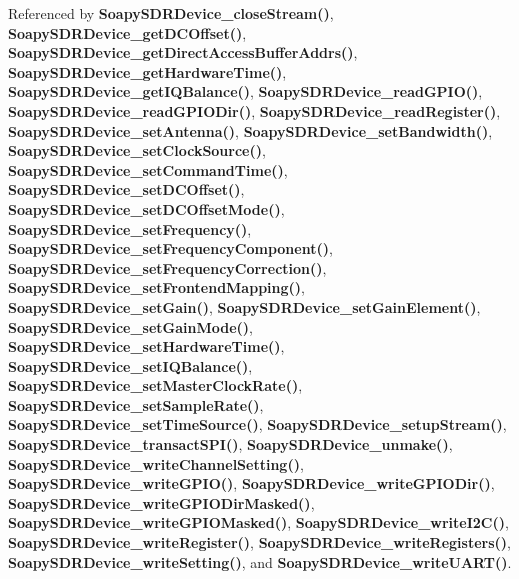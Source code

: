 Referenced by {\bf Soapy\+S\+D\+R\+Device\+\_\+close\+Stream()}, {\bf Soapy\+S\+D\+R\+Device\+\_\+get\+D\+C\+Offset()}, {\bf Soapy\+S\+D\+R\+Device\+\_\+get\+Direct\+Access\+Buffer\+Addrs()}, {\bf Soapy\+S\+D\+R\+Device\+\_\+get\+Hardware\+Time()}, {\bf Soapy\+S\+D\+R\+Device\+\_\+get\+I\+Q\+Balance()}, {\bf Soapy\+S\+D\+R\+Device\+\_\+read\+G\+P\+I\+O()}, {\bf Soapy\+S\+D\+R\+Device\+\_\+read\+G\+P\+I\+O\+Dir()}, {\bf Soapy\+S\+D\+R\+Device\+\_\+read\+Register()}, {\bf Soapy\+S\+D\+R\+Device\+\_\+set\+Antenna()}, {\bf Soapy\+S\+D\+R\+Device\+\_\+set\+Bandwidth()}, {\bf Soapy\+S\+D\+R\+Device\+\_\+set\+Clock\+Source()}, {\bf Soapy\+S\+D\+R\+Device\+\_\+set\+Command\+Time()}, {\bf Soapy\+S\+D\+R\+Device\+\_\+set\+D\+C\+Offset()}, {\bf Soapy\+S\+D\+R\+Device\+\_\+set\+D\+C\+Offset\+Mode()}, {\bf Soapy\+S\+D\+R\+Device\+\_\+set\+Frequency()}, {\bf Soapy\+S\+D\+R\+Device\+\_\+set\+Frequency\+Component()}, {\bf Soapy\+S\+D\+R\+Device\+\_\+set\+Frequency\+Correction()}, {\bf Soapy\+S\+D\+R\+Device\+\_\+set\+Frontend\+Mapping()}, {\bf Soapy\+S\+D\+R\+Device\+\_\+set\+Gain()}, {\bf Soapy\+S\+D\+R\+Device\+\_\+set\+Gain\+Element()}, {\bf Soapy\+S\+D\+R\+Device\+\_\+set\+Gain\+Mode()}, {\bf Soapy\+S\+D\+R\+Device\+\_\+set\+Hardware\+Time()}, {\bf Soapy\+S\+D\+R\+Device\+\_\+set\+I\+Q\+Balance()}, {\bf Soapy\+S\+D\+R\+Device\+\_\+set\+Master\+Clock\+Rate()}, {\bf Soapy\+S\+D\+R\+Device\+\_\+set\+Sample\+Rate()}, {\bf Soapy\+S\+D\+R\+Device\+\_\+set\+Time\+Source()}, {\bf Soapy\+S\+D\+R\+Device\+\_\+setup\+Stream()}, {\bf Soapy\+S\+D\+R\+Device\+\_\+transact\+S\+P\+I()}, {\bf Soapy\+S\+D\+R\+Device\+\_\+unmake()}, {\bf Soapy\+S\+D\+R\+Device\+\_\+write\+Channel\+Setting()}, {\bf Soapy\+S\+D\+R\+Device\+\_\+write\+G\+P\+I\+O()}, {\bf Soapy\+S\+D\+R\+Device\+\_\+write\+G\+P\+I\+O\+Dir()}, {\bf Soapy\+S\+D\+R\+Device\+\_\+write\+G\+P\+I\+O\+Dir\+Masked()}, {\bf Soapy\+S\+D\+R\+Device\+\_\+write\+G\+P\+I\+O\+Masked()}, {\bf Soapy\+S\+D\+R\+Device\+\_\+write\+I2\+C()}, {\bf Soapy\+S\+D\+R\+Device\+\_\+write\+Register()}, {\bf Soapy\+S\+D\+R\+Device\+\_\+write\+Registers()}, {\bf Soapy\+S\+D\+R\+Device\+\_\+write\+Setting()}, and {\bf Soapy\+S\+D\+R\+Device\+\_\+write\+U\+A\+R\+T()}.

